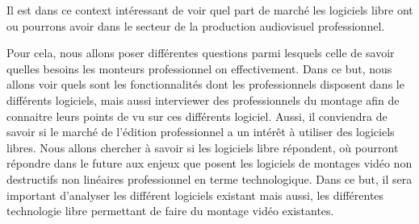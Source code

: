 Il est dans ce context intéressant de voir quel part de marché les
logiciels libre ont ou pourrons avoir dans le secteur de la production
audiovisuel professionnel.

Pour cela, nous allons poser différentes questions parmi lesquels
celle de savoir quelles besoins les monteurs professionnel
on effectivement. Dans ce but, nous allons voir quels sont les
fonctionnalités dont les professionnels disposent dans le différents
logiciels, mais aussi interviewer des professionnels du montage afin
de connaitre leurs points de vu sur ces différents logiciel. Aussi,
il conviendra de savoir si le marché de l'édition professionnel a
un intérêt à utiliser des logiciels libres. Nous allons chercher à
savoir si les logiciels libre répondent, où pourront répondre dans
le future aux enjeux que posent les logiciels de montages vidéo non
destructifs non linéaires professionnel en terme technologique. Dans
ce but, il sera important d'analyser les différent logiciels existant
mais aussi, les différentes technologie libre permettant de faire du
montage vidéo existantes.
